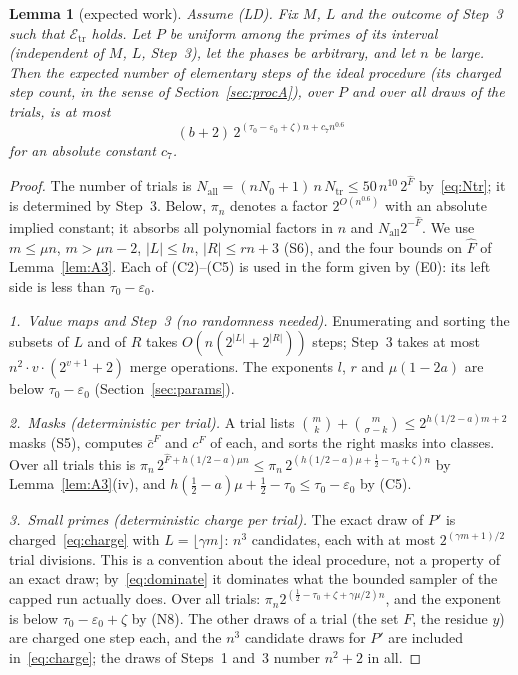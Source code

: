 \documentclass[11pt]{article}
\newtheorem{lemma}{Lemma}[section]
\theoremstyle{definition}
\newcommand{\eps}{\varepsilon}
\newcommand{\bc}{\bar c}
\newcommand{\abs}[1]{\lvert #1\rvert}
\newcommand{\floor}[1]{\lfloor #1\rfloor}
\newcommand{\cE}{\mathcal E}
\newcommand{\Ntr}{N_{\mathrm{tr}}}
\begin{document}
\begin{lemma}[expected work]\label{lem:A7}
Assume \textup{(LD)}. Fix $M$, $L$ and the outcome of Step~3 such that $\cE_{\mathrm{tr}}$ holds. Let $P$ be uniform
among the primes of its interval (independent of $M$, $L$, Step~3), let the phases be arbitrary, and let $n$ be
large. Then the expected number of elementary steps of the ideal procedure (its charged step count, in the sense
of Section~\ref{sec:procA}), over $P$ and over all draws of the trials, is at most
\[
 (b+2)\,2^{(\tau_0-\eps_0+\zeta)n+c_7n^{0.6}}
\]
for an absolute constant $c_7$.
\end{lemma}
\begin{proof}
The number of trials is $N_{\mathrm{all}}=(nN_0+1)\,n\,\Ntr\le50\,n^{10}\,2^{\hat F}$ by~\eqref{eq:Ntr}; it is
determined by Step~3. Below, $\pi_n$ denotes a factor $2^{O(n^{0.6})}$ with an absolute implied constant; it absorbs
all polynomial factors in $n$ and $N_{\mathrm{all}}2^{-\hat F}$. We use $m\le\mu n$, $m>\mu n-2$,
$\abs L\le ln$, $\abs R\le rn+3$ \textup{(S6)}, and the four bounds on $\hat F$ of Lemma~\ref{lem:A3}. Each of
\textup{(C2)--(C5)} is used in the form given by \textup{(E0)}: its left side is less than $\tau_0-\eps_0$.

\emph{1.\ Value maps and Step~3 (no randomness needed).} Enumerating and sorting the subsets of $L$ and of $R$
takes $O(n(2^{\abs L}+2^{\abs R}))$ steps; Step~3 takes at most $n^2\cdot v\cdot(2^{v+1}+2)$ merge operations. The
exponents $l$, $r$ and $\mu(1-2a)$ are below $\tau_0-\eps_0$ (Section~\ref{sec:params}).

\emph{2.\ Masks (deterministic per trial).} A trial lists $\binom mk+\binom m{\sigma-k}\le2^{h(1/2-a)m+2}$ masks
\textup{(S5)}, computes $\bc^F$ and $c^F$ of each, and sorts the right masks into classes. Over all trials this is
$\pi_n\,2^{\hat F+h(1/2-a)\mu n}\le\pi_n\,2^{(h(1/2-a)\mu+\frac12-\tau_0+\zeta)n}$ by Lemma~\ref{lem:A3}(iv), and
$h(\tfrac12-a)\mu+\tfrac12-\tau_0\le\tau_0-\eps_0$ by \textup{(C5)}.

\emph{3.\ Small primes (deterministic charge per trial).} The exact draw of $P'$ is charged~\eqref{eq:charge}
with $L=\floor{\gamma m}$: $n^3$ candidates, each with at most $2^{(\gamma m+1)/2}$ trial divisions. This is a
convention about the ideal procedure, not a property of an exact draw; by~\eqref{eq:dominate} it dominates what the
bounded sampler of the capped run actually does. Over all trials: $\pi_n2^{(\frac12-\tau_0+\zeta+\gamma\mu/2)n}$,
and the exponent is
below $\tau_0-\eps_0+\zeta$ by \textup{(N8)}. The other draws of a trial (the set $F$, the residue $y$) are charged
one step each, and the $n^3$ candidate draws for $P'$ are included in~\eqref{eq:charge}; the draws of Steps~1
and~3 number $n^2+2$ in all.


\end{proof}
\end{document}

